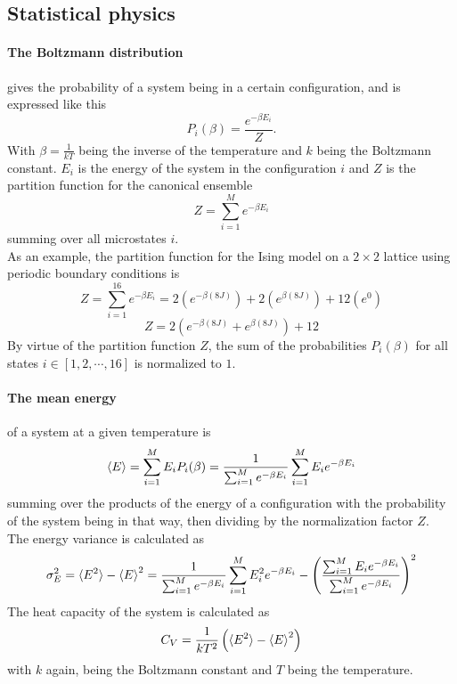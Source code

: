 \documentclass[10pt,a4paper]{article}
\begin{document}
\subsection{Statistical physics}
\paragraph{The Boltzmann distribution}gives the probability of a system being in a certain configuration, and is expressed like this
\begin{equation}
P_i(\beta) = \frac{e^{-\beta E_i}}{Z}.
\end{equation}
With $\beta = \frac{1}{kT}$ being the inverse of the temperature and $k$ being the Boltzmann constant. $E_i$ is the energy of the system in the configuration $i$ and $Z$ is the partition function for the canonical ensemble
\begin{equation}
Z = \sum_{i=1}^M e^{-\beta E_i}
\end{equation}
summing over all microstates $i$. \cite{Lecture_Notes_Fall_2015}\\As an example, the partition function for the Ising model on a $2\times2$ lattice using periodic boundary conditions is
\begin{equation}
Z = \sum_{i=1}^{16} e^{-\beta E_i} = 2\left( e^{-\beta (8J)} \right) +2\left( e^{\beta (8J)} \right) +12\left( e^{0} \right)
\end{equation}
\begin{equation}
Z =  2\left( e^{-\beta (8J)} +e^{\beta (8J)} \right)+12
\end{equation}
By virtue of the partition function $Z$, the sum of the probabilities $P_i(\beta)$ for all states $i \in [1,2,\cdots,16]$ is normalized to $1$. 
\paragraph{The mean energy} of a system at a given temperature is 
\begin{equation}\label{mean energy equation}
\braket{E} = \sum_{i=1}^{M} E_iP_i(\beta) = \frac{1}{\sum_{i=1}^M e^{-\beta E_i}} \sum_{i=1}^M E_ie^{-\beta E_i}
\end{equation}
summing over the products of the energy of a configuration with the probability of the system being in that way, then dividing by the normalization factor $Z$.\\The energy variance is calculated as
\begin{equation}\label{C_V definition equation}
\sigma_E^2 = \braket{E^2}-\braket{E}^2 = \frac{1}{\sum_{i=1}^M e^{-\beta E_i}} \sum_{i=1}^M E_i^2e^{-\beta E_i} - \left( \frac{\sum_{i=1}^M E_ie^{-\beta E_i}}{\sum_{i=1}^M e^{-\beta E_i}} \right)^2
\end{equation}
The heat capacity of the system is calculated as 
\begin{equation}
C_V = \frac{1}{kT^2} \left(  \braket{E^2}-\braket{E}^2  \right)
\end{equation}
with $k$ again, being the Boltzmann constant and $T$ being the temperature.
\end{document}
